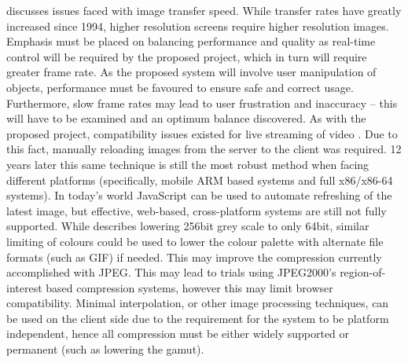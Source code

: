 \documentclass[11pt]{article} %
\begin{document}
\cite{goldberg1995desktop} discusses issues faced with image transfer speed. While transfer rates have greatly increased since 1994, higher resolution screens require higher resolution images. Emphasis must be placed on balancing performance and quality as real-time control will be required by the proposed project, which in turn will require greater frame rate. As the proposed system will involve user manipulation of objects, performance must be favoured to ensure safe and correct usage. Furthermore, slow frame rates may lead to user frustration and inaccuracy – this will have to be examined and an optimum balance discovered.
As with the proposed project, compatibility issues existed for live streaming of video \cite{goldberg1995desktop}. Due to this fact, manually reloading images from the server to the client was required. 12 years later this same technique is still the most robust method when facing different platforms (specifically, mobile ARM based systems and full x86/x86-64 systems). In today's world JavaScript can be used to automate refreshing of the latest image, but effective, web-based, cross-platform systems are still not fully supported. 
While \cite{goldberg1995desktop} describes lowering 256bit grey scale to only 64bit, similar limiting of colours could be used to lower the colour palette with alternate file formats (such as GIF) if needed. This may improve the compression currently accomplished with JPEG. This may lead to trials using JPEG2000's region-of-interest based compression systems, however this may limit browser compatibility. Minimal interpolation, or other image processing techniques, can be used on the client side due to the requirement for the system to be platform independent, hence all compression must be either widely supported or permanent (such as lowering the gamut).
\end{document}
